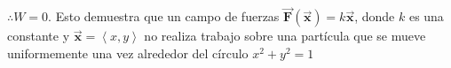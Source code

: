 \documentclass[12pt]{exam}
\newcommand{\vecb}[1]{\pmb{\vec{#1}}} %
\newcommand{\pvec}[1]{\left\langle #1 \right\rangle} %
\begin{document}
\begin{questions}
\begin{enumerate}[a)]
    $\therefore W= 0$. Esto demuestra que un campo de fuerzas $\vecb{F}(\vecb{x}) = k\vecb{x}$, donde $k$ es una constante y $\vecb{x}=\pvec{x,y}$ no realiza trabajo sobre una
    partícula que se mueve uniformemente una vez alrededor del círculo $x^2+y^2=1$

  \end{enumerate}


\end{questions}

























\vskip30pt
\RaggedRight

\newpage



\pagestyle{foot}    %
\end{document}
